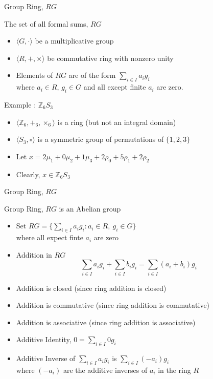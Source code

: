 \documentclass{beamer}
\begin{document}
\begin{frame}{Group Ring, $RG$}
\begin{block}{The set of all formal sums, $RG$}
\begin{itemize}
	\item $\langle G,\cdot \rangle$ be a multiplicative group
	\item $\langle R,+,\times \rangle$ be commutative ring with nonzero unity
	\item Elements of $RG$ are of the form $\sum_{i \in I} a_ig_i$\\
		where $a_i \in R$, $g_i \in G$ and all except finite $a_i$ are zero.
\end{itemize}
\end{block}
	\begin{exampleblock}{Example : $\mathbb{Z}_6S_3$}
	\begin{itemize}
		\item $\langle \mathbb{Z}_6,+_6,\times_6 \rangle$ is a ring (but not an integral domain)
		\item $\langle S_3, \circ \rangle$ is a symmetric group of permutations of $\{ 1,2,3\}$
		\item Let $ x = 2\mu_1 + 0\mu_2 + 1\mu_3 + 2\rho_0 + 5\rho_1 + 2\rho_2$
		\item Clearly, $x \in \mathbb{Z}_6S_3$
	\end{itemize}
	\end{exampleblock}
\end{frame}

\begin{frame}{Group Ring, $RG$}
\begin{block}{Group Ring, $RG$ is an Abelian group}
\begin{itemize}
	\item Set $RG = \big\{ \sum_{i \in I} a_ig_i : a_i \in R,\ g_i \in G \big\}$\\
		where all expect finte $a_i$ are zero
	\item Addition in $RG$
		$$ \sum_{i \in I}a_ig_i + \sum_{i \in I} b_i g_i  = \sum_{i \in I} (a_i+b_i)g_i $$
	\item Addition is closed (since ring addition is closed)
	\item Addition is commutative (since ring addition is commutative)
	\item Addition is associative (since ring addition is associative)
	\item Additive Identity, $0 = \sum_{i \in I} 0g_i$
	\item Additive Inverse of $\sum_{i \in I} a_ig_i$ is $\sum_{i \in I} (-a_i)g_i$\\
		where $(-a_i)$ are the additive inverses of $a_i$ in the ring $R$
\end{itemize}
\end{block}
\end{frame}
\end{document}
